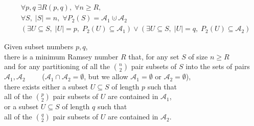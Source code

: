 \documentclass[letterpaper,12pt]{article}
\author{Dylan Hutchison}
\theoremstyle{plain}
\newtheorem{thm}{Theorem}%
\theoremstyle{definition}
\theoremstyle{remark}
\newtheorem{remark}{Remark}
\theoremstyle{definition}
\newenvironment{myindentpar}[1]%
 {\begin{list}{}%
         {\setlength{\leftmargin}{#1}}%
         \item[]%
 }
 {\end{list}}
\begin{document}
\begin{align*}
&\forall p,q \;\exists R(p,q),\; \forall n \geq R, \\
&\forall S, \;|S|=n, \;\forall P_2(S)=\mathcal{A}_1 \cupdot \mathcal{A}_2 \\
&(\exists U \subseteq S, \; |U|=p, \; P_2(U) \subseteq \mathcal{A}_1) \lor (\exists U \subseteq S, \; |U|=q, \; P_2(U) \subseteq \mathcal{A}_2) 
\end{align*}

\begin{myindentpar}{2em}
Given subset numbers $p,q$, \\
there is a minimum Ramsey number $R$ that, for any set $S$ of size $n \geq R$ \\
and for any partitioning of all the $\binom{n}{2}$ pair subsets of $S$ into the sets of pairs \\
\phantom{$\qquad$} $\mathcal{A}_1, \mathcal{A}_2 \qquad$ ($\mathcal{A}_1 \cap \mathcal{A}_2 = \emptyset$, but we allow $\mathcal{A}_1 = \emptyset$ or $\mathcal{A}_2 = \emptyset$), \\
there exists either a subset $U \subseteq S$ of length $p$ such that \\
\phantom{$\qquad$} all of the $\binom{p}{2}$ pair subsets of $U$ are contained in $\mathcal{A}_1$, \\
or a subset $U \subseteq S$ of length $q$ such that \\
\phantom{$\qquad$} all of the $\binom{q}{2}$ pair subsets of $U$ are contained in $\mathcal{A}_2$.
\end{myindentpar}
\end{document}
